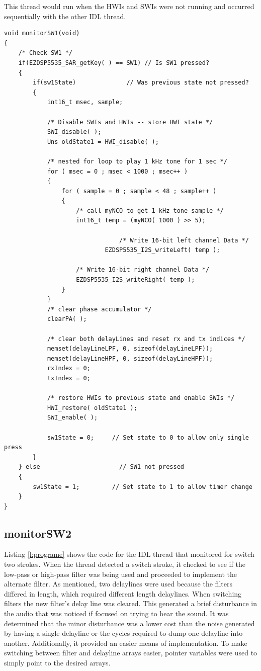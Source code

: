\documentclass[11pt,pdftex,portrait,letterpaper]{article}
\begin{document}
This thread would run when the HWIs and SWIs were not running and occurred sequentially with the other IDL thread.

\begin{lstlisting}[caption={IDL thread for monitoring switch one strokes and playing a tone}, label=l:programd]
void monitorSW1(void)
{
	/* Check SW1 */
	if(EZDSP5535_SAR_getKey( ) == SW1) // Is SW1 pressed?
	{
		if(sw1State)              // Was previous state not pressed?
		{
			int16_t msec, sample;

			/* Disable SWIs and HWIs -- store HWI state */
			SWI_disable( );
			Uns oldState1 = HWI_disable( );

			/* nested for loop to play 1 kHz tone for 1 sec */
			for ( msec = 0 ; msec < 1000 ; msec++ )
			{
				for ( sample = 0 ; sample < 48 ; sample++ )
				{
					/* call myNCO to get 1 kHz tone sample */
					int16_t temp = (myNCO( 1000 ) >> 5);

	                			/* Write 16-bit left channel Data */
	              			EZDSP5535_I2S_writeLeft( temp );

					/* Write 16-bit right channel Data */
					EZDSP5535_I2S_writeRight( temp );
				}
			}
			/* clear phase accumulator */
			clearPA( );

			/* clear both delayLines and reset rx and tx indices */
			memset(delayLineLPF, 0, sizeof(delayLineLPF));
			memset(delayLineHPF, 0, sizeof(delayLineHPF));
			rxIndex = 0;
			txIndex = 0;

			/* restore HWIs to previous state and enable SWIs */
			HWI_restore( oldState1 );
			SWI_enable( );

			sw1State = 0;     // Set state to 0 to allow only single press
		}
	} else                      // SW1 not pressed
	{
		sw1State = 1;         // Set state to 1 to allow timer change
	}
}
\end{lstlisting}

\subsection{monitorSW2}

Listing \ref{l:programe} shows the code for the IDL thread that monitored for switch two strokes. When the thread detected a switch stroke, it checked to see if the low-pass or high-pass filter was being used and proceeded to implement the alternate filter. As mentioned, two delaylines were used because the filters differed in length, which required different length delaylines. When switching filters the new filter's delay line was cleared. This generated a brief disturbance in the audio that was noticed if focused on trying to hear the sound. It was determined that the minor disturbance was a lower cost than the noise generated by having a single delayline or the cycles required to dump one delayline into another. Additionally, it provided an easier means of implementation. To make switching between filter and delayline arrays easier, pointer variables were used to simply point to the desired arrays.
\end{document}
